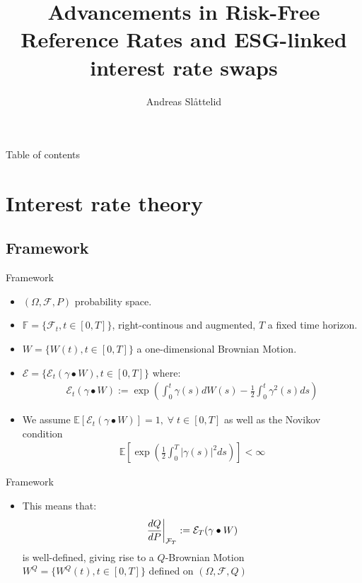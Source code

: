 \documentclass[UKenglish]{beamer}
\author{Andreas Slåttelid}
\title{Advancements in Risk-Free Reference Rates and ESG-linked interest rate swaps}
\newcommand{\E}{\mathbb{E}}  %
\newcommand{\F}{\mathcal{F}} %
\begin{document}


%
%
\begin{frame}{Table of contents}
    \tableofcontents[currentsection]
\end{frame}


\section{Interest rate theory}
\subsection{Framework}

\begin{frame}{Framework}
\begin{itemize}
    \item $(\Omega, \F, P)$ probability space.  
    \item $\mathbb{F} = \{\F_{t}, t \in [0,T]\}$, right-continous and augmented, $T$ a fixed time horizon. 
    \item $W = \{W(t), t\in [0,T]\}$ a one-dimensional Brownian Motion. 
    \item $\mathcal{E} = \{\mathcal{E}_{t}(\gamma \bullet W), t \in [0,T]\}$ where: 
    \begin{align*}
     \mathcal{E}_{t}(\gamma \bullet W) := \exp\left(
     \int_{0}^{t}\gamma(s)dW(s) -\frac{1}{2}\int_{0}^{t}\gamma^{2}(s)ds
     \right)   
    \end{align*}
    \item We assume $ \E[\mathcal{E}_{t}(\gamma \bullet W)] = 1, \; \forall\;t\in [0,T]$ as well as the Novikov condition 
    \begin{align*}
     \E\left[
     \exp\left(
     \frac{1}{2}\int_{0}^{T}|\gamma(s)|^{2}ds
     \right)
     \right] < \infty   
    \end{align*}
\end{itemize}
\end{frame}


\begin{frame}{Framework}
\begin{itemize}
    \item This means that: 
    \begin{align*}
    \frac{dQ}{dP}\bigg{|}_{\F_{T}} := \mathcal{E}_{T}(\gamma \bullet W)   
    \end{align*}
    is well-defined, giving rise to a $Q$-Brownian Motion $W^{Q} = \{W^{Q}(t), t\in [0,T]\} $ defined on $(\Omega, \F, Q)$
\end{itemize} 
\end{frame}
\end{document}
